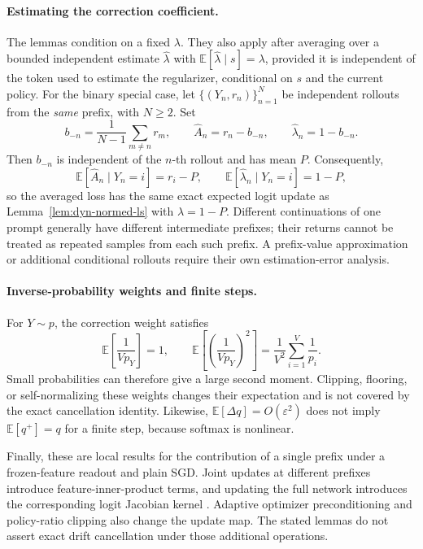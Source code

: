 \paragraph{Estimating the correction coefficient.}
The lemmas condition on a fixed $\lambda$. They also apply after averaging
over a bounded independent estimate $\widehat\lambda$ with
$\mathbb E[\widehat\lambda\mid s]=\lambda$, provided it is independent
of the token used to estimate the regularizer, conditional on $s$ and the
current policy. For the binary special case, let
$\{(Y_n,r_n)\}_{n=1}^N$ be independent rollouts from the \emph{same}
prefix, with $N\ge2$. Set
\begin{equation}
 b_{-n}=\frac{1}{N-1}\sum_{m\ne n}r_m,\qquad
 \widehat A_n=r_n-b_{-n},\qquad
 \widehat\lambda_n=1-b_{-n}.
 \label{eq:dyn-loo}
\end{equation}
Then $b_{-n}$ is independent of the $n$-th rollout and has mean $P$.
Consequently,
\[
 \mathbb E[\widehat A_n\mid Y_n=i]=r_i-P,\qquad
 \mathbb E[\widehat\lambda_n\mid Y_n=i]=1-P,
\]
so the averaged loss has the same exact expected logit update as
Lemma~\ref{lem:dyn-normed-ls} with $\lambda=1-P$.
Different continuations of one prompt generally have different intermediate
prefixes; their returns cannot be treated as repeated samples from each
such prefix. A prefix-value approximation or additional conditional
rollouts require their own estimation-error analysis.

\paragraph{Inverse-probability weights and finite steps.}
For $Y\sim p$, the correction weight satisfies
\begin{equation}
 \mathbb E\left[\frac1{Vp_Y}\right]=1,\qquad
 \mathbb E\left[\left(\frac1{Vp_Y}\right)^2\right]
 =\frac1{V^2}\sum_{i=1}^V\frac1{p_i}.
 \label{eq:dyn-weight-moment}
\end{equation}
Small probabilities can therefore give a large second moment.
Clipping, flooring, or self-normalizing these weights changes their
expectation and is not covered by the exact cancellation identity.
Likewise, $\mathbb E[\Delta q]=O(\varepsilon^2)$ does not imply
$\mathbb E[q^+]=q$ for a finite step, because softmax is nonlinear.

Finally, these are local results for the contribution of a single prefix
under a frozen-feature readout and plain SGD. Joint updates at different
prefixes introduce feature-inner-product terms, and updating the full
network introduces the corresponding logit Jacobian kernel
\citep{ren2025learningdynamics}. Adaptive optimizer preconditioning and
policy-ratio clipping also change the update map. The stated lemmas do
not assert exact drift cancellation under those additional operations.

